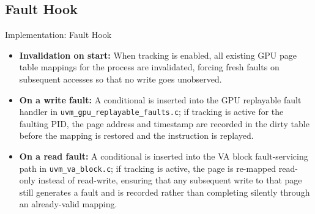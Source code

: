 \documentclass [xcolor=svgnames, t] {beamer}
\begin{document}
\subsection{Fault Hook}
\begin{frame}{Implementation: Fault Hook}
\begin{itemize}
	\item \textbf{Invalidation on start:} When tracking is enabled, all existing GPU page table mappings for the process are invalidated, forcing fresh faults on subsequent accesses so that no write goes unobserved.
	\item \textbf{On a write fault:} A conditional is inserted into the GPU replayable fault handler in \texttt{uvm\_gpu\_replayable\_faults.c}; if tracking is active for the faulting PID, the page address and timestamp are recorded in the dirty table before the mapping is restored and the instruction is replayed.
	\item \textbf{On a read fault:} A conditional is inserted into the VA block fault-servicing path in \texttt{uvm\_va\_block.c}; if tracking is active, the page is re-mapped read-only instead of read-write, ensuring that any subsequent write to that page still generates a fault and is recorded rather than completing silently through an already-valid mapping.
\end{itemize}
\end{frame}
\end{document}
